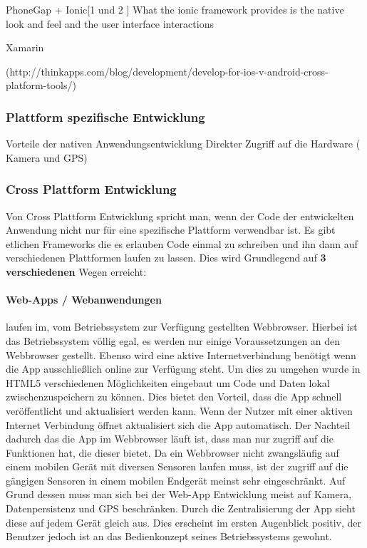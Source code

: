 PhoneGap + Ionic[1 und 2 ] %
What the ionic framework provides is the native look and feel and the user interface interactions

Xamarin  

(http://thinkapps.com/blog/development/develop-for-ios-v-android-cross-platform-tools/) 


\subsubsection{Plattform spezifische Entwicklung}
Vorteile der nativen Anwendungsentwicklung %
Direkter Zugriff auf die Hardware ( Kamera und GPS) 

\subsubsection{Cross Plattform Entwicklung}
Von Cross Plattform Entwicklung spricht man, wenn der Code der entwickelten Anwendung nicht nur für eine spezifische Plattform verwendbar ist. 
Es gibt etlichen Frameworks die es erlauben Code einmal zu schreiben und ihn dann auf verschiedenen Plattformen laufen zu lassen. Dies wird Grundlegend auf \textbf{3 verschiedenen} Wegen erreicht:
\paragraph{Web-Apps / Webanwendungen}laufen im, vom Betriebssystem zur Verfügung gestellten Webbrowser. Hierbei ist das Betriebssystem völlig egal, es werden nur einige Voraussetzungen an den Webbrowser gestellt. Ebenso wird eine aktive Internetverbindung benötigt wenn die App ausschließlich online zur Verfügung steht. Um dies zu umgehen wurde in HTML5 verschiedenen Möglichkeiten eingebaut um Code und Daten lokal zwischenzuspeichern zu können. Dies bietet den Vorteil, dass die App schnell veröffentlicht und aktualisiert werden kann. Wenn der Nutzer mit einer aktiven Internet Verbindung öffnet aktualisiert sich die App automatisch. 
Der Nachteil dadurch das die App im Webbrowser läuft ist, dass man nur zugriff auf die Funktionen hat, die dieser bietet. Da ein Webbrowser nicht zwangsläufig auf einem mobilen Gerät mit diversen Sensoren laufen muss, ist der zugriff auf die gängigen Sensoren in einem mobilen Endgerät meinst sehr eingeschränkt. Auf Grund dessen muss man sich bei der Web-App Entwicklung meist auf Kamera, Datenpersistenz und GPS beschränken. Durch die Zentralisierung der App sieht diese auf jedem Gerät gleich aus. Dies erscheint im ersten Augenblick positiv, der Benutzer jedoch ist an das Bedienkonzept seines Betriebssystems gewohnt.

